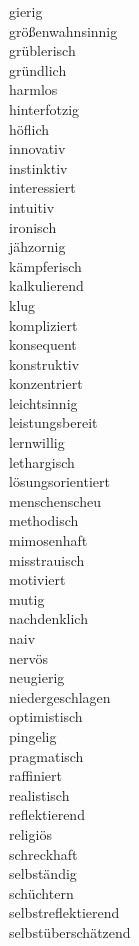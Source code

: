 \documentclass[10pt,a4paper]{article}
\begin{document}
gierig \\
größenwahnsinnig \\
grüblerisch \\
gründlich \\
harmlos \\
hinterfotzig \\
höflich \\
innovativ \\
instinktiv \\
interessiert \\
intuitiv \\
ironisch \\
jähzornig \\
kämpferisch \\
kalkulierend \\
klug \\
kompliziert \\
konsequent \\
konstruktiv \\
konzentriert \\
leichtsinnig \\
leistungsbereit \\
lernwillig \\
lethargisch \\
lösungsorientiert \\
menschenscheu \\
methodisch \\
mimosenhaft \\
misstrauisch \\
motiviert \\
mutig \\
nachdenklich \\
naiv \\
nervös \\
neugierig \\
niedergeschlagen \\
optimistisch \\
pingelig \\
pragmatisch \\
raffiniert \\
realistisch \\
reflektierend \\
religiös \\
schreckhaft \\
selbständig \\
schüchtern \\
selbstreflektierend \\
selbstüberschätzend \\
\end{document}
